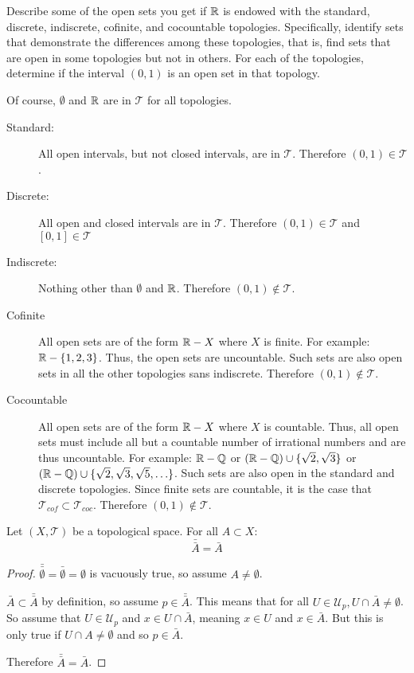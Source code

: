 \documentclass[letterpaper,12pt,fleqn]{article}
\newcommand{\T}{\mathscr{T}}
\newcommand{\U}{\mathcal{U}}
\begin{document}
\begin{example}[Exercise 2.6]
  Describe some of the open sets you get if \(\mathbb{R}\) is endowed with the standard, discrete, indiscrete, cofinite,
  and cocountable topologies.  Specifically, identify sets that demonstrate the differences among these topologies,
  that is, find sets that are open in some topologies but not in others.  For each of the topologies, determine
  if the interval \((0,1)\) is an open set in that topology.

  Of course, \(\emptyset\) and \(\mathbb{R}\) are in \(\T\) for all topologies.

  \begin{description}
  \item[Standard:] All open intervals, but not closed intervals, are in \(\T\).  Therefore \((0,1)\in\T\).

  \item[Discrete:] All open and closed intervals are in \(\T\).  Therefore \((0,1)\in\T\) and \([0,1]\in\T\)

  \item[Indiscrete:] Nothing other than \(\emptyset\) and \(\mathbb{R}\).  Therefore \((0,1)\notin\T\).

  \item[Cofinite] All open sets are of the form \(\mathbb{R}-X\) where \(X\) is finite.  For example: \(\mathbb{R}-\{1,2,3\}\).
    Thus, the open sets are uncountable.  Such sets are also open sets in all the other topologies sans indiscrete.
    Therefore \((0,1)\notin\T\).

  \item[Cocountable] All open sets are of the form \(\mathbb{R}-X\) where \(X\) is countable.  Thus, all open sets must
    include all but a countable number of irrational numbers and are thus uncountable.  For example: \(\mathbb{R}-\mathbb{Q}\) or
    \((\mathbb{R}-\mathbb{Q})\cup\{\sqrt{2},\sqrt{3}\}\) or \((\mathbb{R}-\mathbb{Q})\cup\{\sqrt{2},\sqrt{3},\sqrt{5},\ldots\}\).  Such sets are
    also open in the standard and discrete topologies.  Since finite sets are countable, it is the case that
    \(\T_{cof}\subset\T_{coc}\).  Therefore \((0,1)\notin\T\).
  \end{description}
\end{example}

\begin{theorem}[2.13]
  Let \((X,\T)\) be a topological space.  For all \(A\subset X\):
  \[\bar{\bar{A}}=\bar{A}\]
\end{theorem}

\begin{proof}
  \(\bar{\bar{\emptyset}}=\bar{\emptyset}=\emptyset\) is vacuously true, so assume \(A\ne\emptyset\).

  \(\bar{A}\subset\bar{\bar{A}}\) by definition, so assume \(p\in\bar{\bar{A}}\).  This means that for all
  \(U\in\U_p,U\cap\bar{A}\ne\emptyset\).  So assume that \(U\in\U_p\) and \(x\in U\cap\bar{A}\), meaning \(x\in U\)
  and \(x\in\bar{A}\).  But this is only true if \(U\cap A\ne\emptyset\) and so \(p\in\bar{A}\).

  Therefore \(\bar{\bar{A}}=\bar{A}\).
\end{proof}
\end{document}
